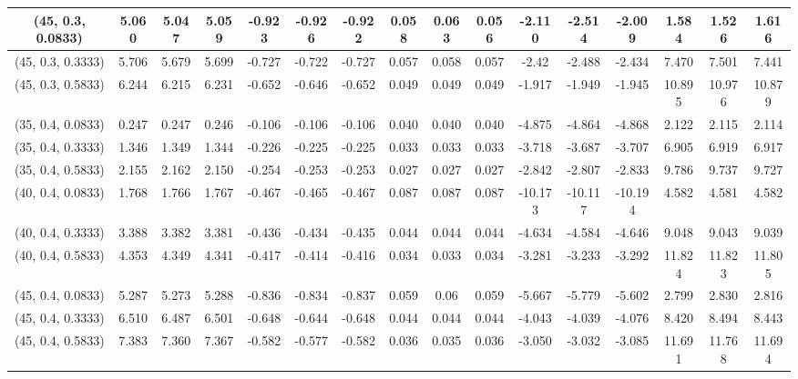 \documentclass[preprint,12pt,1p]{elsarticle}
\begin{document}
\begin{table}[!h]
\begin{center}
{\begin{tabular}{| c | c | c | c | c | c | c| c| c| c| c| c| c| c| c| c|}
(45, 0.3, 0.0833)&  5.060&  5.047&  5.059&  -0.923& -0.926&  -0.922& 0.058& 0.063& 0.056& -2.110& -2.514& -2.009& 1.584& 1.526& 1.616 \\ \hline    
(45, 0.3, 0.3333)&  5.706&  5.679&  5.699&  -0.727& -0.722&  -0.727& 0.057& 0.058& 0.057& -2.42& -2.488& -2.434& 7.470& 7.501& 7.441\\ \hline    
(45, 0.3, 0.5833)&  6.244&6.215&6.231&-0.652&-0.646&-0.652&0.049&0.049&0.049&-1.917&-1.949&-1.945&10.895&10.976&10.879 \\ \hline    
(35, 0.4, 0.0833)&  0.247&0.247&0.246&-0.106&-0.106&-0.106&0.040&0.040&0.040&-4.875&-4.864&-4.868&2.122&2.115&2.114 \\ \hline    
(35, 0.4, 0.3333)&  1.346&1.349&1.344&-0.226&-0.225&-0.225&0.033&0.033&0.033&-3.718&-3.687&-3.707&6.905&6.919&6.917 \\ \hline    
(35, 0.4, 0.5833)&  2.155&2.162&2.150&-0.254&-0.253&-0.253&0.027&0.027&0.027&-2.842&-2.807&-2.833&9.786&9.737&9.727 \\ \hline    
(40, 0.4, 0.0833)&  1.768&1.766&1.767&-0.467&-0.465&-0.467&0.087&0.087&0.087&-10.173&-10.117&-10.194&4.582&4.581&4.582 \\ \hline 
(40, 0.4, 0.3333)&  3.388&3.382&3.381&-0.436&-0.434&-0.435&0.044&0.044&0.044&-4.634&-4.584&-4.646&9.048&9.043&9.039 \\ \hline 
(40, 0.4, 0.5833)&  4.353 & 4.349 & 4.341 & -0.417 & -0.414 & -0.416 & 0.034 & 0.033 & 0.034 & -3.281 & -3.233 & -3.292 & 11.824 & 11.823 & 11.805  \\ \hline 
(45, 0.4, 0.0833)&  5.287 & 5.273 & 5.288 & -0.836 & -0.834 & -0.837 & 0.059 & 0.06 & 0.059 & -5.667 & -5.779 & -5.602 & 2.799 & 2.830 & 2.816  \\ \hline 
(45, 0.4, 0.3333)&  6.510 & 6.487 & 6.501 & -0.648 & -0.644 & -0.648 & 0.044 & 0.044 & 0.044 & -4.043 & -4.039 & -4.076 & 8.420 & 8.494 & 8.443  \\ \hline 
(45, 0.4, 0.5833)&  7.383 & 7.360 & 7.367 & -0.582 & -0.577 & -0.582 & 0.036 & 0.035 & 0.036 & -3.050 & -3.032 & -3.085 & 11.691 & 11.768 & 11.694 \\ \hline 
\end{tabular}}
\end{center}
\end{table}
\end{document}
